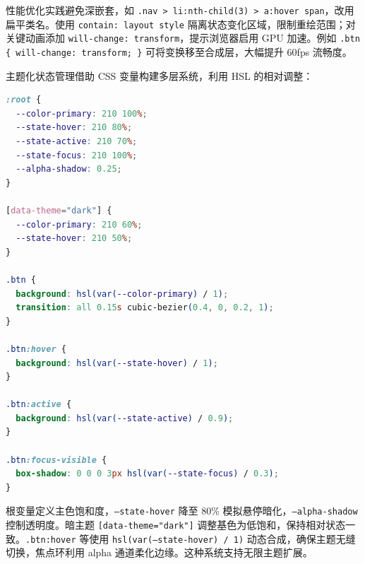 性能优化实践避免深嵌套，如 \texttt{.nav > li:nth-child(3) > a:hover span}，改用扁平类名。使用 \texttt{contain: layout style} 隔离状态变化区域，限制重绘范围；对关键动画添加 \texttt{will-change: transform}，提示浏览器启用 GPU 加速。例如 \texttt{.btn \{{} will-change: transform; \}{}} 可将变换移至合成层，大幅提升 60fps 流畅度。\par
主题化状态管理借助 CSS 变量构建多层系统，利用 HSL 的相对调整：\par
\begin{lstlisting}[language=css]
:root {
  --color-primary: 210 100%;
  --state-hover: 210 80%;
  --state-active: 210 70%;
  --state-focus: 210 100%;
  --alpha-shadow: 0.25;
}

[data-theme="dark"] {
  --color-primary: 210 60%;
  --state-hover: 210 50%;
}

.btn {
  background: hsl(var(--color-primary) / 1);
  transition: all 0.15s cubic-bezier(0.4, 0, 0.2, 1);
}

.btn:hover {
  background: hsl(var(--state-hover) / 1);
}

.btn:active {
  background: hsl(var(--state-active) / 0.9);
}

.btn:focus-visible {
  box-shadow: 0 0 0 3px hsl(var(--state-focus) / 0.3);
}
\end{lstlisting}
根变量定义主色饱和度，\texttt{--state-hover} 降至 80\%{} 模拟悬停暗化，\texttt{--alpha-shadow} 控制透明度。暗主题 \texttt{[data-theme="dark"]} 调整基色为低饱和，保持相对状态一致。\texttt{.btn:hover} 等使用 \texttt{hsl(var(--state-hover) / 1)} 动态合成，确保主题无缝切换，焦点环利用 alpha 通道柔化边缘。这种系统支持无限主题扩展。\par

